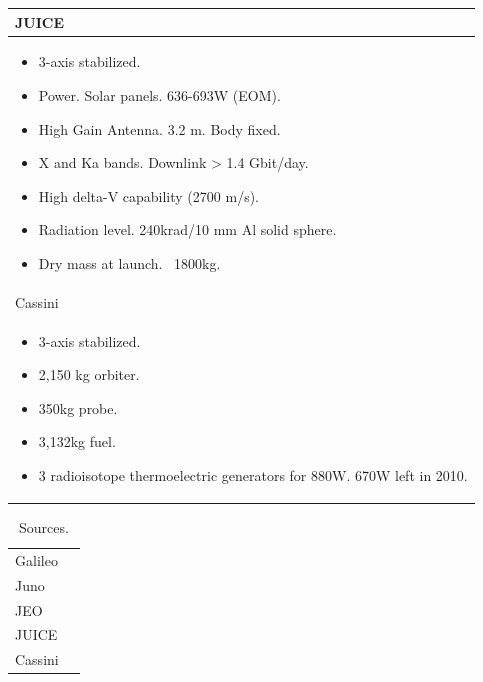 \begin{longtable}{p{\textwidth}}
  JUICE \\* \midrule

  \begin{itemize}
  \item 3-axis stabilized.
  \item Power. Solar panels. 636-693W (EOM).
  \item High Gain Antenna. 3.2 m. Body fixed.
  \item X and Ka bands. Downlink > 1.4 Gbit/day.
  \item High delta-V capability (2700 m/s).
  \item Radiation level. 240krad/10 mm Al solid sphere.
  \item Dry mass at launch. ~1800kg.
  \end{itemize} \\

  Cassini \\* \midrule

  \begin{itemize}
  \item 3-axis stabilized.
  \item 2,150 kg orbiter.
  \item 350kg probe.
  \item 3,132kg fuel.
  \item 3 radioisotope thermoelectric generators for 880W. 670W left
    in 2010.
  \end{itemize} \\
\end{longtable}

\begin{longtable}{ll}
  \caption{Sources.} \\ \toprule

  Galileo & \cite{galileonasa,galileojpl} \\

  Juno & \cite{junonasa} \\

  JEO & \cite{jeonasa} \\

  JUICE & \cite{juiceesa} \\

  Cassini & \cite{cassininasa} \\ \bottomrule
\end{longtable}


